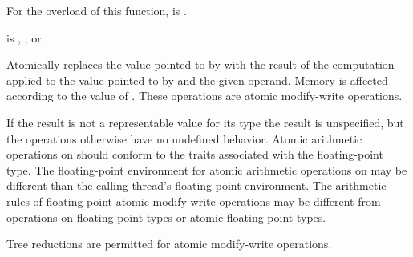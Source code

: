 \begin{itemdescr}
\pnum
\constraints
For the  overload of this function,
 is .

\pnum
\expects
{} is
,
, or
.

\pnum
\effects
Atomically replaces the value pointed to by 
with the result of the computation applied to
the value pointed to by  and the given operand.
Memory is affected according to the value of .
These operations are atomic modify-write operations.

\pnum
\remarks
If the result is not a representable value for its type
the result is unspecified,
but the operations otherwise have no undefined behavior.
Atomic arithmetic operations on 
should conform to the 
traits associated with the floating-point type.
The floating-point environment for
atomic arithmetic operations on 
may be different than the calling thread's floating-point environment.
The arithmetic rules of floating-point atomic modify-write operations
may be different from operations on
floating-point types or atomic floating-point types.
\begin{note}
Tree reductions are permitted for atomic modify-write operations.
\end{note}


\end{itemdescr}
